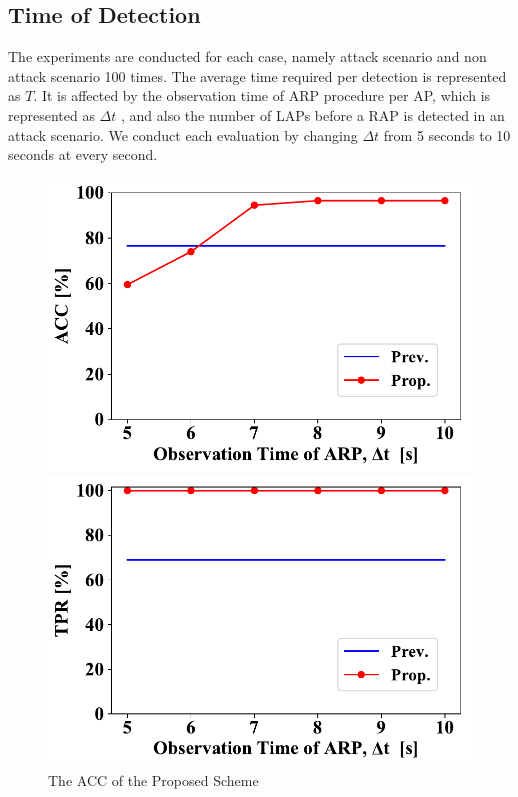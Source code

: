 \documentclass[conference]{IEEEtran}
\begin{document}
\subsection{Time of Detection}
The experiments are conducted for each case, namely attack scenario and non attack scenario 100 times.
The average time required per detection is represented as $T$.
It is affected by the observation time of ARP procedure per AP, which is represented as $\Delta t$ , and also the number of LAPs before a RAP is detected in an attack scenario.
We conduct each evaluation by changing $\Delta t$ from 5 seconds to 10 seconds at every second.

\begin{figure}[ht]
    \begin{minipage}{0.33\hsize}
        \begin{center}
            \includegraphics[scale=0.4]{image/ACC.pdf}
        \end{center}
        \caption{The ACC of the Proposed Scheme}
        \label{fig:acc}
    \end{minipage}
    \begin{minipage}{0.33\hsize}
        \begin{center}
            \includegraphics[scale=0.4]{image/TPR.pdf}

\end{center}
\end{minipage}
\end{figure}
\end{document}
